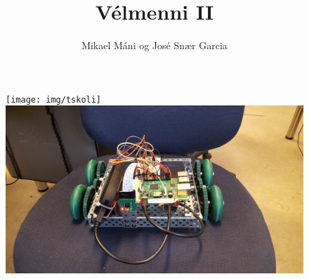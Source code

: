 \documentclass{article}
\begin{document}
\title{Vélmenni II}
\author{Mikael Máni og José Snær Garcia}
\maketitle
\begin{figure}[h]
\centering
\texttt{[image: img/tskoli]}
\includegraphics[scale=1]{img/rob2b3u_img}
\end{figure}
\newpage
\tableofcontents
\newpage



\newpage



\newpage



\newpage

\end{document}
